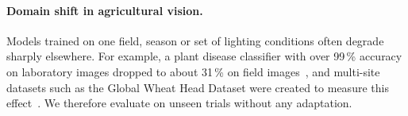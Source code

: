 \paragraph{Domain shift in agricultural vision.} Models trained on one field, season or set of
lighting conditions often degrade sharply elsewhere. For example, a plant disease classifier with
over 99\,\% accuracy on laboratory images dropped to about 31\,\% on field images~\cite{mohanty2016using},
and multi-site datasets such as the Global Wheat Head Dataset were created to measure
this effect~\cite{david2020global}. We therefore evaluate on unseen trials without any adaptation.
